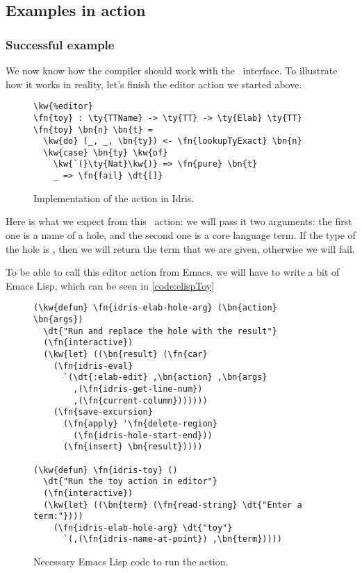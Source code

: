 \subsection{Examples in action}\label{sec:designExample}

\subsubsection{Successful example}

We now know how the compiler should work with the \Editorable\ interface.
To illustrate how it works in reality, let's finish the  editor action
we started above.

\begin{figure}[H]
\begin{Verbatim}[framesep=2mm, label=\footnotesize{\normalfont{Idris}}, labelposition=topline]
\kw{%editor}
\fn{toy} : \ty{TTName} -> \ty{TT} -> \ty{Elab} \ty{TT}
\fn{toy} \bn{n} \bn{t} =
  \kw{do} (_, _, \bn{ty}) <- \fn{lookupTyExact} \bn{n}
  \kw{case} \bn{ty} \kw{of}
    \kw{`(}\ty{Nat}\kw{)} => \fn{pure} \bn{t}
    _ => \fn{fail} \dt{[]}
\end{Verbatim}
\caption{Implementation of the  action in Idris.}
\end{figure}

Here is what we expect from this \Elab\ action: we will pass it two arguments:
the first one is a name of a hole, and the second one is a core language term.
If the type of the hole is , then we will return the term that we are
given, otherwise we will fail.

To be able to call this editor action from Emacs, we will have to write a bit
of Emacs Lisp, which can be seen in \autoref{code:elispToy}

\begin{figure}[ht]
\begin{Verbatim}[framesep=2mm, label=\footnotesize{\normalfont{Emacs Lisp}}, labelposition=topline]
(\kw{defun} \fn{idris-elab-hole-arg} (\bn{action} \bn{args})
  \dt{"Run and replace the hole with the result"}
  (\fn{interactive})
  (\kw{let} ((\bn{result} (\fn{car}
    (\fn{idris-eval}
      `(\dt{:elab-edit} ,\bn{action} ,\bn{args}
        ,(\fn{idris-get-line-num})
        ,(\fn{current-column}))))))
    (\fn{save-excursion}
      (\fn{apply} '\fn{delete-region}
        (\fn{idris-hole-start-end}))
      (\fn{insert} \bn{result}))))

(\kw{defun} \fn{idris-toy} ()
  \dt{"Run the toy action in editor"}
  (\fn{interactive})
  (\kw{let} ((\bn{term} (\fn{read-string} \dt{"Enter a term:"})))
    (\fn{idris-elab-hole-arg} \dt{"toy"}
      `(,(\fn{idris-name-at-point}) ,\bn{term}))))
\end{Verbatim}
\caption{Necessary Emacs Lisp code to run the  action.}
\label{code:elispToy}
\end{figure}

